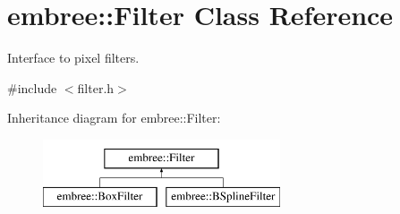 \hypertarget{classembree_1_1_filter}{
\section{embree::Filter Class Reference}
\label{classembree_1_1_filter}
}


Interface to pixel filters.  




{\ttfamily \#include $<$filter.h$>$}

Inheritance diagram for embree::Filter:\begin{figure}[H]
\begin{center}
\leavevmode
\includegraphics[height=2.000000cm]{classembree_1_1_filter}
\end{center}
\end{figure}

